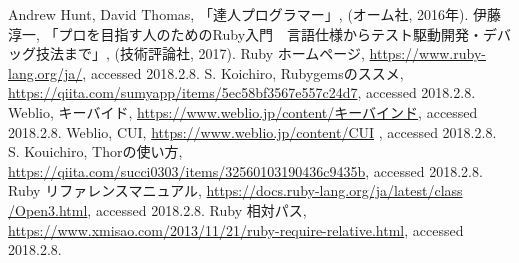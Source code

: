 \begin{thebibliography}{9}
 Andrew Hunt, David Thomas, 「達人プログラマー」, (オーム社, 2016年).
伊藤淳一, 「プロを目指す人のためのRuby入門　言語仕様からテスト駆動開発・デバッグ技法まで」, (技術評論社, 2017).
 Ruby ホームページ, \url{https://www.ruby-lang.org/ja/}, accessed 2018.2.8.
 S. Koichiro, Rubygemsのススメ, \url{https://qiita.com/sumyapp/items/5ec58bf3567e557c24d7}, accessed 2018.2.8.
 Weblio, キーバイド, \url{https://www.weblio.jp/content/キーバインド}, accessed 2018.2.8.
 Weblio, CUI, \url{https://www.weblio.jp/content/CUI} , accessed 2018.2.8.
 S. Kouichiro, Thorの使い方, \url{https://qiita.com/succi0303/items/32560103190436c9435b}, accessed 2018.2.8.
 Ruby リファレンスマニュアル, \url{https://docs.ruby-lang.org/ja/latest/class /Open3.html}, accessed 2018.2.8.
 Ruby 相対パス, \url{https://www.xmisao.com/2013/11/21/ruby-require-relative.html}, accessed 2018.2.8.
\end{thebibliography} 